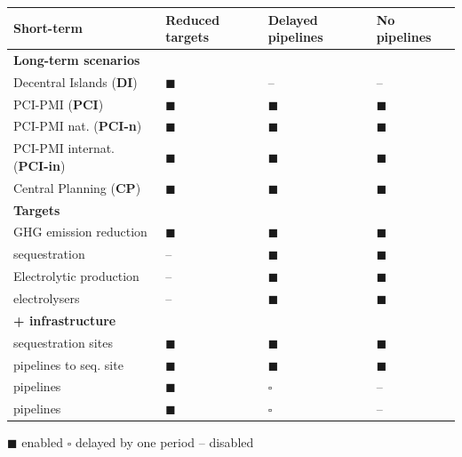 \documentclass[a0,portrait]{a0poster}
\begin{document}
\begin{multicols}{3}
\begin{center}
    \label{tab:regret_matrix_setup}
    \scriptsize
    \begin{tabularx}{\linewidth}{R{7.5cm}>{\centering\arraybackslash}X>{\centering\arraybackslash}X>{\centering\arraybackslash}X}
        \toprule
        \textbf{Short-term} & \textbf{Reduced targets} & \textbf{Delayed pipelines} & \textbf{No pipelines} \\
        \midrule
        \textbf{Long-term scenarios} & & & \\
        Decentral Islands (\textbf{DI}) & $\blacksquare$ & -- & -- \\
        PCI-PMI (\textbf{PCI}) & $\blacksquare$ & $\blacksquare$ & $\blacksquare$ \\
        PCI-PMI nat. (\textbf{PCI-n}) & $\blacksquare$ & $\blacksquare$ & $\blacksquare$\\
        PCI-PMI internat. (\textbf{PCI-in}) & $\blacksquare$ & $\blacksquare$ & $\blacksquare$ \\
        Central Planning (\textbf{CP}) & $\blacksquare$ & $\blacksquare$ & $\blacksquare$ \\
        \midrule
        \textbf{Targets} & & & \\
        GHG emission reduction &  $\blacksquare$ &  $\blacksquare$ &  $\blacksquare$ \\
         sequestration &  -- &  $\blacksquare$ &  $\blacksquare$ \\
        Electrolytic  production &  -- &  $\blacksquare$ &  $\blacksquare$ \\
         electrolysers &  -- &  $\blacksquare$ &  $\blacksquare$ \\
        \midrule
        \textbf{ +  infrastructure} & & & \\
         sequestration sites & $\blacksquare$ &  $\blacksquare$ &  $\blacksquare$ \\
         pipelines to seq. site & $\blacksquare$ &  $\blacksquare$ &  $\blacksquare$ \\
         pipelines & $\blacksquare$ &  $\square$ &  -- \\
         pipelines & $\blacksquare$ &  $\square$ &  -- \\
        \bottomrule
    \end{tabularx}
    $\blacksquare$ enabled \quad $\square$ delayed by one period \quad -- disabled
\end{center}
\vspace{2em}


\end{multicols}
\end{document}
